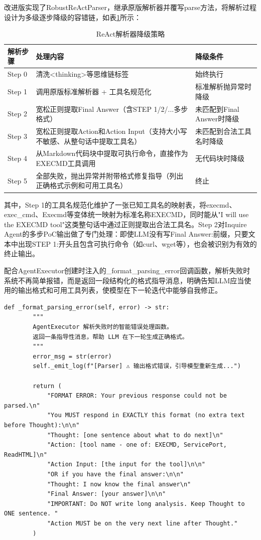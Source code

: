 改进版实现了RobustReActParser，继承原版解析器并覆写parse方法，将解析过程设计为多级逐步降级的容错链，如表\ref{tab:ch3:5}所示：

\begin{table}[htbp]
\centering
\caption{ReAct解析器降级策略} \label{tab:ch3:5}
  \renewcommand{\arraystretch}{1.3}
\begin{tabular}{l>{\raggedright\arraybackslash}p{5cm}>{\raggedright\arraybackslash}p{5cm}}
    \toprule
解析步骤 & 处理内容 & 降级条件 \\
    \midrule
Step 0 & 清洗<thinking>等思维链标签 & 始终执行 \\
    \midrule
Step 1 & 调用原版标准解析器 + 工具名规范化 & 标准解析抛异常时降级 \\
    \midrule
Step 2 & 宽松正则提取Final Answer（含STEP 1/2/...多步格式） & 未匹配到Final Answer时降级 \\
    \midrule
Step 3 & 宽松正则提取Action和Action Input（支持大小写不敏感、从整句话中提取工具名） & 未匹配到合法工具名时降级 \\
    \midrule
Step 4 & 从Markdown代码块中提取可执行命令，直接作为EXECMD工具调用 & 无代码块时降级 \\
    \midrule
Step 5 & 全部失败，抛出异常并附带格式修复指导（列出正确格式示例和可用工具名） & 终止 \\
    \bottomrule
\end{tabular}
\end{table}

其中，Step 1的工具名规范化维护了一张已知工具名的映射表，将execmd、exec\_cmd、Execmd等变体统一映射为标准名称EXECMD，同时能从"I will use the EXECMD tool"这类整句话中通过正则提取出合法工具名。Step 2对Inquire Agent的多步PoC输出做了专门处理：即使LLM没有写Final Answer:前缀，只要文本中出现STEP 1:开头且包含可执行命令（如curl、wget等），也会被识别为有效的终止输出。

配合AgentExecutor创建时注入的\_format\_parsing\_error回调函数，解析失败时系统不再简单报错，而是返回一段结构化的格式指导消息，明确告知LLM应当使用的输出格式和可用工具列表，使模型在下一轮迭代中能够自我修正。

\begin{Verbatim}[mathescape=false]
def _format_parsing_error(self, error) -> str:
        """
        AgentExecutor 解析失败时的智能错误处理函数。
        返回一条指导性消息，帮助 LLM 在下一轮生成正确格式。
        """
        error_msg = str(error)
        self._emit_log(f"[Parser] ⚠️ 输出格式错误，引导模型重新生成...")
        
        return (
            "FORMAT ERROR: Your previous response could not be parsed.\n"
            "You MUST respond in EXACTLY this format (no extra text before Thought):\n\n"
            "Thought: [one sentence about what to do next]\n"
            "Action: [tool name - one of: EXECMD, ServicePort, ReadHTML]\n"
            "Action Input: [the input for the tool]\n\n"
            "OR if you have the final answer:\n\n"
            "Thought: I now know the final answer\n"
            "Final Answer: [your answer]\n\n"
            "IMPORTANT: Do NOT write long analysis. Keep Thought to ONE sentence. "
            "Action MUST be on the very next line after Thought."
        )
\end{Verbatim}

